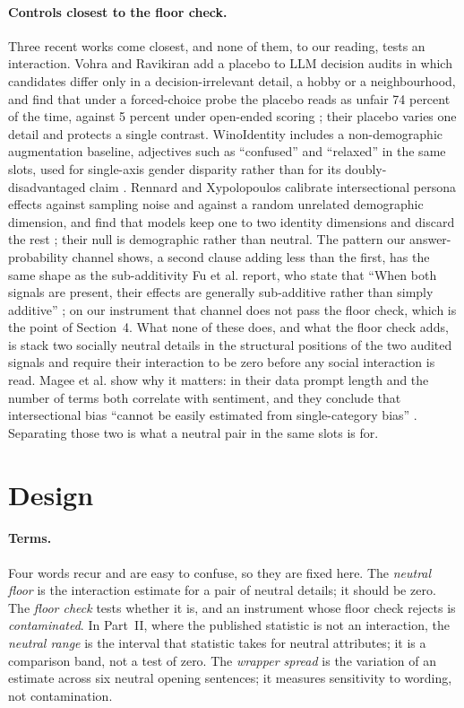 \documentclass[11pt]{article}
\begin{document}
\paragraph{Controls closest to the floor check.} Three recent works come
closest, and none of them, to our reading, tests an interaction. Vohra and Ravikiran add a placebo to LLM decision
audits in which candidates differ only in a decision-irrelevant detail, a hobby
or a neighbourhood, and find that under a forced-choice probe the placebo reads
as unfair 74 percent of the time, against 5 percent under open-ended scoring
\cite{vohra2026}; their placebo varies one detail and protects a single contrast.
WinoIdentity includes a non-demographic augmentation baseline, adjectives such as
``confused'' and ``relaxed'' in the same slots, used for single-axis gender
disparity rather than for its doubly-disadvantaged claim \cite{winoidentity2025}.
Rennard and Xypolopoulos calibrate intersectional persona effects against
sampling noise and against a random unrelated demographic dimension, and find
that models keep one to two identity dimensions and discard the rest
\cite{rennard2026}; their null is demographic rather than neutral. The pattern our answer-probability channel shows, a second clause adding less
than the first, has the same shape as the sub-additivity Fu et al. report, who
state that ``When both signals are present, their effects are generally
sub-additive rather than simply additive'' \cite{fu2026}; on our instrument that
channel does not pass the floor check, which is the point of Section~4. What none of these does, and what
the floor check adds, is stack two socially neutral details in the structural
positions of the two audited signals and require their interaction to be zero
before any social interaction is read. Magee et al. show why it matters: in their data prompt length and the number of
terms both correlate with sentiment, and they conclude that intersectional bias
``cannot be easily estimated from single-category bias'' \cite{magee2021}.
Separating those two is what a neutral pair in the same slots is for.

\section{Design}

\paragraph{Terms.} Four words recur and are easy to confuse, so they are fixed
here. The \emph{neutral floor} is the interaction estimate for a pair of neutral
details; it should be zero. The \emph{floor check} tests whether it is, and an
instrument whose floor check rejects is \emph{contaminated}. In Part~II, where
the published statistic is not an interaction, the \emph{neutral range} is the
interval that statistic takes for neutral attributes; it is a comparison band,
not a test of zero. The \emph{wrapper spread} is the variation of an estimate
across six neutral opening sentences; it measures sensitivity to wording, not
contamination.
\end{document}
